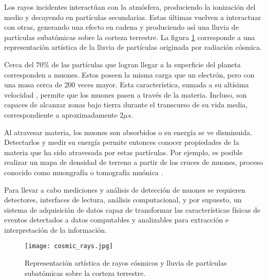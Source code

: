 	Los rayos incidentes interactúan con la atmósfera, produciendo la ionización del medio y decayendo en partículas secundarias. Estas últimas vuelven a interactuar con otras, generando una efecto en cadena y produciendo así una lluvia de partículas subatómicas sobre la corteza terrestre. La figura \ref{img:cosmic-ray} corresponde a una representación artística de la lluvia de partículas originada por radiación cósmica.
	
	Cerca del 70\% de las partículas que logran llegar a la superficie del planeta corresponden a muones. Estos poseen la misma carga que un electrón, pero con una masa cerca de 200 veces mayor. Esta característica, sumada a su altísima velocidad , permite que los muones pasen a través de la materia. Incluso, son capaces de alcanzar zonas bajo tierra durante el transcurso de su vida media, correspondiente a aproximadamente $2\mu s$.
	
	Al atravesar materia, los muones son absorbidos o su energía se ve disminuida. Detectarlos y medir su energía permite entonces conocer propiedades de la materia que ha sido atravesada por estas partículas. Por ejemplo, es posible realizar un mapa de densidad de terreno a partir de los cruces de muones, proceso conocido como muongrafía o tomografía muónica .
	
	Para llevar a cabo mediciones y análisis de detección de muones se requieren detectores, interfaces de lectura, análisis computacional, y por supuesto, un sistema de adquisición de datos capaz de  transformar las características físicas de eventos detectados a datos computables y analizables para extracción e interpretación de la información.
	
	\begin{figure}[h]
		\centering
		\texttt{[image: cosmic\_rays.jpg]}
		\caption{Representación artística de rayos cósmicos y lluvia de partículas subatómicas sobre la corteza terrestre.}
		\label{img:cosmic-ray}
	\end{figure}
	
